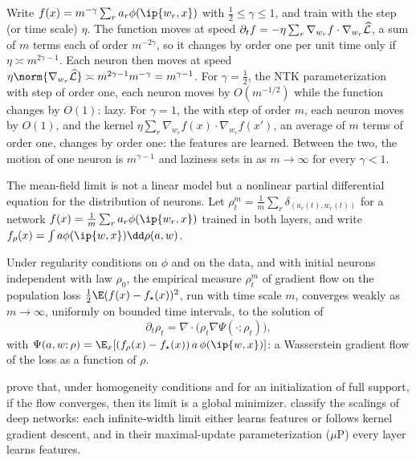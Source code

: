 \begin{refsection}
\begin{heuristic}
Write $f(x)=m^{-\gamma}\sum_ra_r\phi(\ip{w_r,x})$ with $\frac12\le\gamma\le1$, and train with the step (or time scale) $\eta$. The function moves at speed $\partial_tf=-\eta\sum_r\nabla_{w_r}f\cdot\nabla_{w_r}\widehat{\mathcal{L}}$, a sum of $m$ terms each of order $m^{-2\gamma}$, so it changes by order one per unit time only if $\eta\asymp m^{2\gamma-1}$. Each neuron then moves at speed $\eta\norm{\nabla_{w_r}\Lhat}\asymp m^{2\gamma-1}m^{-\gamma}=m^{\gamma-1}$. For $\gamma=\frac12$, the NTK parameterization with step of order one, each neuron moves by $O(m^{-1/2})$ while the function changes by $O(1)$: lazy. For $\gamma=1$, the  with step of order $m$, each neuron moves by $O(1)$, and the kernel $\eta\sum_r\nabla_{w_r}f(x)\cdot\nabla_{w_r}f(x')$, an average of $m$ terms of order one, changes by order one: the features are learned. Between the two, the motion of one neuron is $m^{\gamma-1}$ and laziness sets in as $m\to\infty$ for every $\gamma<1$.
\end{heuristic}

The mean-field limit is not a linear model but a nonlinear partial differential equation for the distribution of neurons. Let $\rho^m_t=\frac1m\sum_r\delta_{(a_r(t),w_r(t))}$ for a network $f(x)=\frac1m\sum_ra_r\phi(\ip{w_r,x})$ trained in both layers, and write $f_\rho(x)=\int a\phi(\ip{w,x})\dd\rho(a,w)$.

\begin{theorem}\label{thm:lazy:meanfield}
Under regularity conditions on $\phi$ and on the data, and with initial neurons independent with law $\rho_0$, the empirical measure $\rho^m_t$ of gradient flow on the population loss $\frac12\E(f(x)-f_\star(x))^2$, run with time scale $m$, converges weakly as $m\to\infty$, uniformly on bounded time intervals, to the solution of
\[
  \partial_t\rho_t=\nabla\cdot\bigl(\rho_t\nabla\Psi(\cdot;\rho_t)\bigr),
\]
with $\Psi(a,w;\rho)=\E_x[(f_\rho(x)-f_\star(x))\,a\,\phi(\ip{w,x})]$: a Wasserstein gradient flow of the loss as a function of $\rho$.
\end{theorem}

\Textcite{ChizatBach2018} prove that, under homogeneity conditions and for an initialization of full support, if the flow converges, then its limit is a global minimizer. \Textcite{YangHu2021} classify the scalings of deep networks: each infinite-width limit either learns features or follows kernel gradient descent, and in their maximal-update parameterization ($\mu$P) every layer learns features.


\end{refsection}
